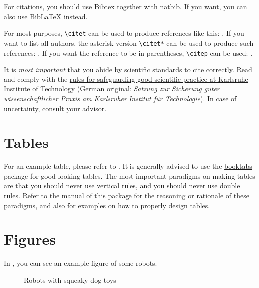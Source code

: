 For citations, you should use Bibtex together with \href{https://www.ctan.org/pkg/natbib}{natbib}.
If you want, you can also use BibLaTeX instead.

For most purposes, \texttt{\textbackslash{}citet} can be used to produce references like this: \citet{deisenroth2013survey}.
If you want to list all authors, the asterisk version \texttt{\textbackslash{}citet*} can be used to produce such references: \citet*{deisenroth2013survey}.
If you want the reference to be in parentheses, \texttt{\textbackslash{}citep} can be used: \citep{deisenroth2013survey}.

It is \emph{most important} that you abide by scientific standards to cite correctly.
Read and comply with the \href{https://www.kit.edu/downloads/gute_wiss_praxis_en.pdf}{rules for safeguarding good scientific practice at Karlsruhe Institute of Technology} (German original:  \href{https://www.sle.kit.edu/downloads/AmtlicheBekanntmachungen/2018_AB_032.pdf}{\textit{Satzung zur Sicherung guter wissenschaftlicher Praxis am Karlsruher Institut für Technologie}}).
In case of uncertainty, consult your advisor.


\section{Tables}

For an example table, please refer to .
It is generally advised to use the \href{https://ctan.org/pkg/booktabs?lang=en}{booktabs} package for good looking tables.
The most important paradigms on making tables are that you should never use vertical rules, and you should never use double rules.
Refer to the manual of this package for the reasoning or rationale of these paradigms, and also for examples on how to properly design tables.


\section{Figures}

In , you can see an example figure of some robots.

\begin{figure}[ht!]
    \centering
    \hspace{1cm}                       
    \caption{Robots with squeaky dog toys}
    \label{fig:example}
\end{figure}

